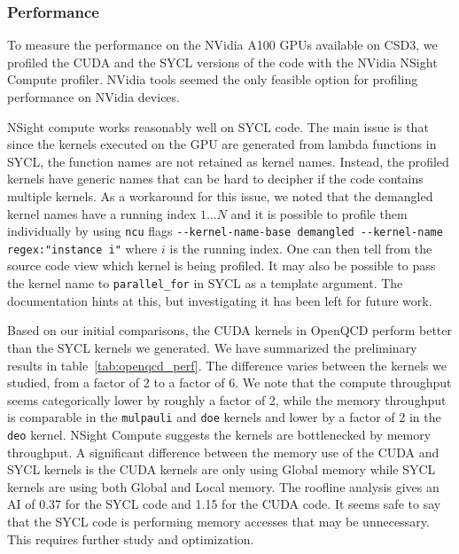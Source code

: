 
\subsubsection{Performance}\label{sec:openqcd_performance}

To measure the performance on the NVidia A100 GPUs available on CSD3, we profiled the CUDA and the SYCL versions of the code with the NVidia NSight Compute profiler.
NVidia tools seemed the only feasible option for profiling performance on NVidia devices.

NSight compute works reasonably well on SYCL code.
The main issue is that since the kernels executed on the GPU are generated from lambda functions in SYCL, the function names are not retained as kernel names.
Instead, the profiled kernels have generic names that can be hard to decipher if the code contains multiple kernels.
As a workaround for this issue, we noted that the demangled kernel names have a running index $1 \ldots N$ and it is possible to profile them individually by using \verb #ncu# flags \verb #--kernel-name-base demangled --kernel-name regex:"instance i"# where $i$ is the running index.  %
One can then tell from the source code view which kernel is being profiled.
It may also be possible to pass the kernel name to \verb #parallel_for# in SYCL as a template argument.
The documentation hints at this, but investigating it has been left for future work.

Based on our initial comparisons, the CUDA kernels in OpenQCD perform better than the SYCL kernels we generated.
We have summarized the preliminary results in table~\ref{tab:openqcd_perf}.
The difference varies between the kernels we studied, from a factor of 2 to a factor of 6.
We note that the compute throughput seems categorically lower by roughly a factor of 2, while the memory throughput is comparable in the \verb #mulpauli# and \verb #doe# kernels and lower by a factor of 2 in the \verb #deo# kernel.
NSight Compute suggests the kernels are bottlenecked by memory throughput.
A significant difference between the memory use of the CUDA and SYCL kernels is the CUDA kernels are only using Global memory while SYCL kernels are using both Global and Local memory.
The roofline analysis gives an AI of 0.37 for the SYCL code and 1.15 for the CUDA code.
It seems safe to say that the SYCL code is performing memory accesses that may be unnecessary.
This requires further study and optimization.

